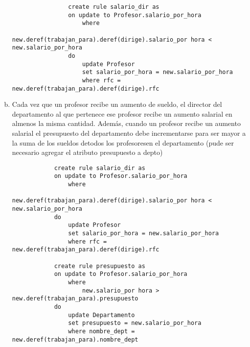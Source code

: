 \documentclass[]{article}
\begin{document}
\begin{enumerate}[a)]
            \begin{lstlisting}
                create rule salario_dir as
                on update to Profesor.salario_por_hora
                    where
                        new.deref(trabajan_para).deref(dirige).salario_por hora < new.salario_por_hora
                do 
                    update Profesor
                    set salario_por_hora = new.salario_por_hora
                    where rfc = new.deref(trabajan_para).deref(dirige).rfc
            \end{lstlisting}

        \item Cada vez que un profesor recibe un aumento de sueldo, el director del departamento al 
        que pertenece ese profesor recibe un aumento salarial en almenos la misma cantidad. Además, 
        cuando un profesor recibe un aumento salarial el presupuesto del departamento debe incrementarse 
        para ser mayor a la suma de los sueldos detodos los profesoresen el departamento (pude ser 
        necesario agregar el atributo presupuesto a depto)

        \begin{lstlisting}
            create rule salario_dir as
            on update to Profesor.salario_por_hora
                where
                    new.deref(trabajan_para).deref(dirige).salario_por hora < new.salario_por_hora
            do 
                update Profesor
                set salario_por_hora = new.salario_por_hora
                where rfc = new.deref(trabajan_para).deref(dirige).rfc

            create rule presupuesto as
            on update to Profesor.salario_por_hora
                where
                    new.salario_por hora > new.deref(trabajan_para).presupuesto
            do 
                update Departamento
                set presupuesto = new.salario_por_hora
                where nombre_dept = new.deref(trabajan_para).nombre_dept
        \end{lstlisting}
    \end{enumerate}
    
\end{document}
